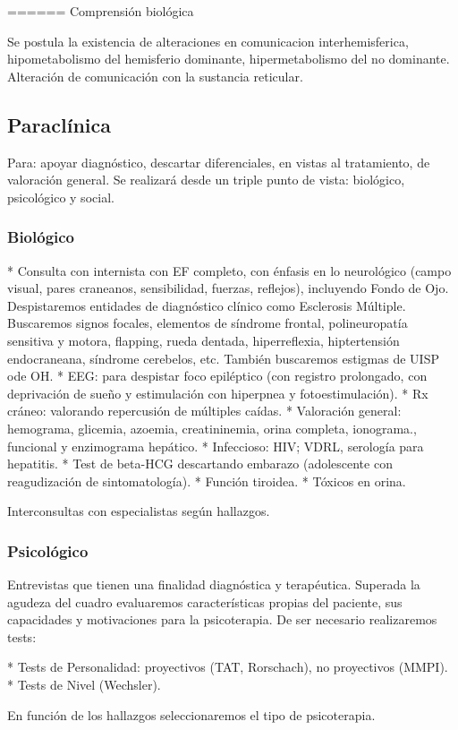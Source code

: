====== Comprensión biológica

Se postula la existencia de alteraciones en comunicacion interhemisferica, hipometabolismo del hemisferio dominante, hipermetabolismo del no dominante. Alteración de comunicación con la sustancia reticular.

\subsection*{Paraclínica}
Para: apoyar diagnóstico, descartar diferenciales, en vistas al tratamiento, de valoración general. Se realizará desde un triple punto de vista: biológico, psicológico y social.
\subsubsection*{Biológico}
* Consulta con internista con EF completo, con énfasis en lo neurológico (campo visual, pares craneanos, sensibilidad, fuerzas, reflejos), incluyendo Fondo de Ojo. Despistaremos entidades de diagnóstico clínico como Esclerosis Múltiple. Buscaremos signos focales, elementos de síndrome frontal, polineuropatía sensitiva y motora, flapping, rueda dentada, hiperreflexia, hiptertensión endocraneana, síndrome cerebelos, etc. También buscaremos estigmas de UISP ode OH.
* EEG: para despistar foco epiléptico (con registro prolongado, con deprivación de sueño y estimulación con hiperpnea y fotoestimulación).
* Rx cráneo: valorando repercusión de múltiples caídas.
* Valoración general: hemograma, glicemia, azoemia, creatininemia, orina completa, ionograma., funcional y enzimograma hepático.
* Infeccioso: HIV; VDRL, serología para hepatitis.
* Test de beta-HCG descartando embarazo (adolescente con reagudización de sintomatología).
* Función tiroidea.
* Tóxicos en orina.

Interconsultas con especialistas según hallazgos.
\subsubsection*{Psicológico}
Entrevistas que tienen una finalidad diagnóstica y terapéutica.
Superada la agudeza del cuadro evaluaremos características propias del paciente, sus capacidades y motivaciones para la psicoterapia. De ser necesario realizaremos tests:

* Tests de Personalidad: proyectivos (TAT, Rorschach), no proyectivos (MMPI).
* Tests de Nivel (Wechsler).

En función de los hallazgos seleccionaremos el tipo de psicoterapia.

